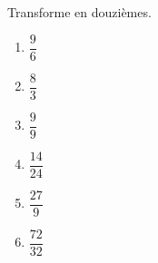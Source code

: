 \documentclass[../../syllabus_2.tex]{subfiles}
\begin{document}
%
\setcounter{exercise}{0}
\begin{exercise}
  Transforme en douzièmes.
  \begin{enumerate}[cols=3]
    \item $\dfrac{9}{6}$
    \item $\dfrac{8}{3}$
    \item $\dfrac{9}{9}$
    \item $\dfrac{14}{24}$
    \item $\dfrac{27}{9}$
    \item $\dfrac{72}{32}$
  \end{enumerate}
\end{exercise}
\end{document}
